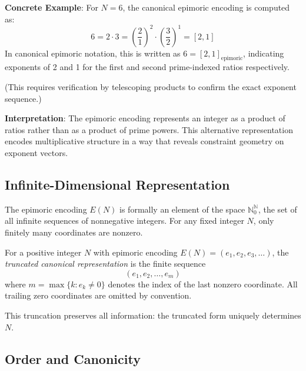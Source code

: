 \noindent \textbf{Concrete Example}: For $N = 6$, the canonical epimoric encoding is computed as:
\begin{equation}
6 = 2 \cdot 3 = \left(\frac{2}{1}\right)^2 \cdot \left(\frac{3}{2}\right)^1 = [2, 1]
\end{equation}
In canonical epimoric notation, this is written as $6 = [2, 1]_{\text{epimoric}}$, indicating exponents of 2 and 1 for the first and second prime-indexed ratios respectively.

\noindent (This requires verification by telescoping products to confirm the exact exponent sequence.)

\noindent \textbf{Interpretation}: The epimoric encoding represents an integer as a product of ratios rather than as a product of prime powers. This alternative representation encodes multiplicative structure in a way that reveals constraint geometry on exponent vectors.

\subsection{Infinite-Dimensional Representation}
\label{subsec:infinite-dimensional}

\begin{remark}
\label{rem:infinite-dim}
The epimoric encoding $E(N)$ is formally an element of the space $\mathbb{N}_0^\mathbb{N}$, the set of all infinite sequences of nonnegative integers. For any fixed integer $N$, only finitely many coordinates are nonzero.
\end{remark}

\begin{definition}
\label{def:truncated-representation}
For a positive integer $N$ with epimoric encoding $E(N) = (e_1, e_2, e_3, \ldots)$, the \emph{truncated canonical representation} is the finite sequence
\begin{equation}
\label{eq:truncated-form}
(e_1, e_2, \ldots, e_m)
\end{equation}
where $m = \max\{k : e_k \neq 0\}$ denotes the index of the last nonzero coordinate. All trailing zero coordinates are omitted by convention.

This truncation preserves all information: the truncated form uniquely determines $N$.
\end{definition}

\subsection{Order and Canonicity}
\label{subsec:canonicity}

